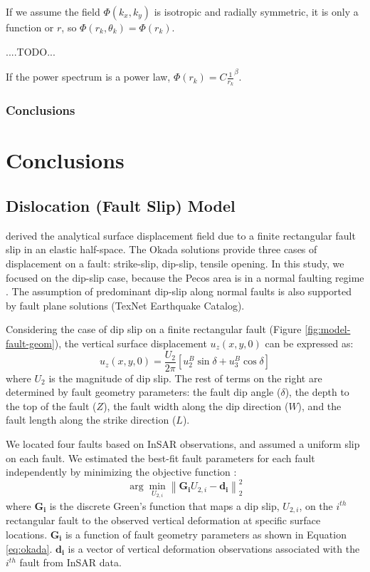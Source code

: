 \documentclass{utexasthesis}
\begin{document}
If we assume the field $\Phi(k_x, k_y)$ is isotropic and radially symmetric, it is only a function or $r$, so $\Phi(r_k, \theta_k) = \Phi(r_k) $.

....TODO...

If the power spectrum is a power law, $\Phi(r_k) = C \frac{1}{r_k}^\beta$. 



\subsection{Conclusions}


\chapter{Conclusions}


\appendix



\section{ Dislocation (Fault Slip) Model}
\cite{Okada1992InternalDeformationDue} derived the analytical surface displacement field due to a finite rectangular fault slip in an elastic half-space. The Okada solutions provide three cases of displacement on a fault: strike-slip, dip-slip, tensile opening. In this study, we focused on the dip-slip case, because the Pecos area is in a normal faulting regime \cite{LundSnee2018}.  The assumption of predominant dip-slip along normal faults is also supported by fault plane solutions (TexNet Earthquake Catalog). 

Considering the case of dip slip on a finite rectangular fault (Figure \ref{fig:model-fault-geom}), the vertical surface displacement $u_z(x, y, 0)$ can be expressed as:
\begin{equation}
	u_{z}(x,y,0)=\frac{U_{2}}{2\pi }[u_{2}^{B}\sin \delta + u_{3}^{B}\cos \delta]
	\label{eq:okada}
\end{equation}
where $U_2$ is the magnitude of dip slip. The rest of terms on the right are determined by fault geometry parameters: the fault dip angle ($\delta$), the depth to the top of the fault ($Z$), the fault width along the dip direction ($W$), and the fault length along the strike direction ($L$). 

We located four faults based on InSAR observations, and assumed a uniform slip on each fault. We estimated the best-fit fault parameters for each fault independently by minimizing the objective function \cite{Du1992}:
\begin{equation}
	\arg \min_{U_{2,i}} \left \| \mathbf{G_i}U_{2,i}-\mathbf{d_i} \right \|^2_{2}  
	\label{eq:model-obj-1}
\end{equation}	  	
where $\mathbf{G_i}$ is the discrete Green’s function that maps a dip slip, $U_{2,i}$, on the $i^{th}$ rectangular fault to the observed vertical deformation at specific surface locations.  $\mathbf{G_i}$ is a function of fault geometry parameters as shown in Equation \eqref{eq:okada}. $\mathbf{d_i}$ is a vector of vertical deformation observations associated with the $i^{th}$ fault from InSAR data.
\end{document}
